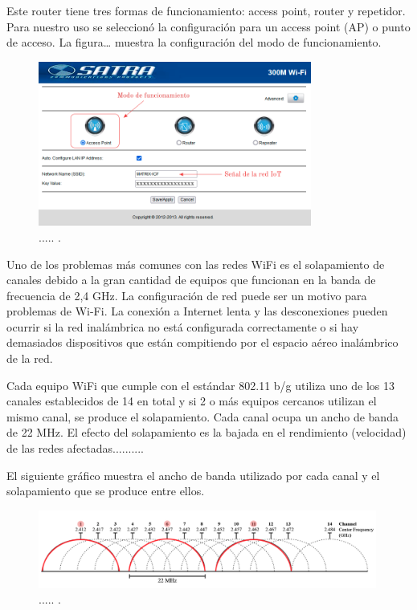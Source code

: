 Este router tiene tres formas de funcionamiento: access point, router y repetidor. Para nuestro uso se seleccionó la configuración para un access point (AP) o punto de acceso. La figura… muestra la configuración del modo de funcionamiento.

\begin{figure}[htpb]
\centering 
\includegraphics[width=0.8\textwidth]{./Figures/funcionamientorouter.png}
\caption{..... .}
\label{fig:funcionamientorouter}
\end{figure}

Uno de los problemas más comunes con las redes WiFi es el solapamiento de canales debido a la gran cantidad de equipos que funcionan en la banda de frecuencia de 2,4 GHz. La configuración de red puede ser un motivo para problemas de Wi-Fi. La conexión a Internet lenta y las desconexiones pueden ocurrir si la red inalámbrica no está configurada correctamente o si hay demasiados dispositivos que están compitiendo por el espacio aéreo inalámbrico de la red. 

Cada equipo WiFi que cumple con el estándar 802.11 b/g utiliza uno de los 13 canales establecidos de 14 en total y si 2 o más equipos cercanos utilizan el mismo canal, se produce el solapamiento. Cada canal ocupa un ancho de banda de 22 MHz. El efecto del solapamiento es la bajada en el rendimiento (velocidad) de las redes afectadas..........

El siguiente gráfico muestra el ancho de banda utilizado por cada canal y el solapamiento que se produce entre ellos.

\begin{figure}[htpb]
\centering 
\includegraphics[width=0.99\textwidth]{./Figures/canales.png}
\caption{..... .}
\label{fig:canales}
\end{figure}

